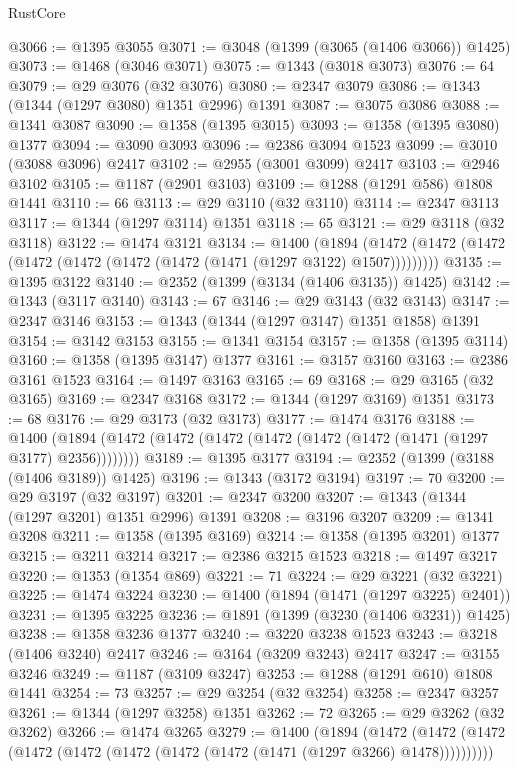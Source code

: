 \begin{lexlean}{RustCore}
\begin{coremodule}
@3066 := @1395 @3055
@3071 := @3048 (@1399 (@3065 (@1406 @3066)) @1425)
@3073 := @1468 (@3046 @3071)
@3075 := @1343 (@3018 @3073)
@3076 := 64
@3079 := @29 @3076 (@32 @3076)
@3080 := @2347 @3079
@3086 := @1343 (@1344 (@1297 @3080) @1351 @2996) @1391
@3087 := @3075 @3086
@3088 := @1341 @3087
@3090 := @1358 (@1395 @3015)
@3093 := @1358 (@1395 @3080) @1377
@3094 := @3090 @3093
@3096 := @2386 @3094 @1523
@3099 := @3010 (@3088 @3096) @2417
@3102 := @2955 (@3001 @3099) @2417
@3103 := @2946 @3102
@3105 := @1187 (@2901 @3103)
@3109 := @1288 (@1291 @586) @1808 @1441
@3110 := 66
@3113 := @29 @3110 (@32 @3110)
@3114 := @2347 @3113
@3117 := @1344 (@1297 @3114) @1351
@3118 := 65
@3121 := @29 @3118 (@32 @3118)
@3122 := @1474 @3121
@3134 := @1400
    (@1894 (@1472 (@1472 (@1472 (@1472 (@1472 (@1472 (@1472 (@1471 (@1297 @3122) @1507)))))))))
@3135 := @1395 @3122
@3140 := @2352 (@1399 (@3134 (@1406 @3135)) @1425)
@3142 := @1343 (@3117 @3140)
@3143 := 67
@3146 := @29 @3143 (@32 @3143)
@3147 := @2347 @3146
@3153 := @1343 (@1344 (@1297 @3147) @1351 @1858) @1391
@3154 := @3142 @3153
@3155 := @1341 @3154
@3157 := @1358 (@1395 @3114)
@3160 := @1358 (@1395 @3147) @1377
@3161 := @3157 @3160
@3163 := @2386 @3161 @1523
@3164 := @1497 @3163
@3165 := 69
@3168 := @29 @3165 (@32 @3165)
@3169 := @2347 @3168
@3172 := @1344 (@1297 @3169) @1351
@3173 := 68
@3176 := @29 @3173 (@32 @3173)
@3177 := @1474 @3176
@3188 := @1400 (@1894 (@1472 (@1472 (@1472 (@1472 (@1472 (@1472 (@1471 (@1297 @3177) @2356))))))))
@3189 := @1395 @3177
@3194 := @2352 (@1399 (@3188 (@1406 @3189)) @1425)
@3196 := @1343 (@3172 @3194)
@3197 := 70
@3200 := @29 @3197 (@32 @3197)
@3201 := @2347 @3200
@3207 := @1343 (@1344 (@1297 @3201) @1351 @2996) @1391
@3208 := @3196 @3207
@3209 := @1341 @3208
@3211 := @1358 (@1395 @3169)
@3214 := @1358 (@1395 @3201) @1377
@3215 := @3211 @3214
@3217 := @2386 @3215 @1523
@3218 := @1497 @3217
@3220 := @1353 (@1354 @869)
@3221 := 71
@3224 := @29 @3221 (@32 @3221)
@3225 := @1474 @3224
@3230 := @1400 (@1894 (@1471 (@1297 @3225) @2401))
@3231 := @1395 @3225
@3236 := @1891 (@1399 (@3230 (@1406 @3231)) @1425)
@3238 := @1358 @3236 @1377
@3240 := @3220 @3238 @1523
@3243 := @3218 (@1406 @3240) @2417
@3246 := @3164 (@3209 @3243) @2417
@3247 := @3155 @3246
@3249 := @1187 (@3109 @3247)
@3253 := @1288 (@1291 @610) @1808 @1441
@3254 := 73
@3257 := @29 @3254 (@32 @3254)
@3258 := @2347 @3257
@3261 := @1344 (@1297 @3258) @1351
@3262 := 72
@3265 := @29 @3262 (@32 @3262)
@3266 := @1474 @3265
@3279 := @1400
    (@1894
      (@1472 (@1472 (@1472 (@1472 (@1472 (@1472 (@1472 (@1472 (@1471 (@1297 @3266) @1478))))))))))

\end{coremodule}
\end{lexlean}
